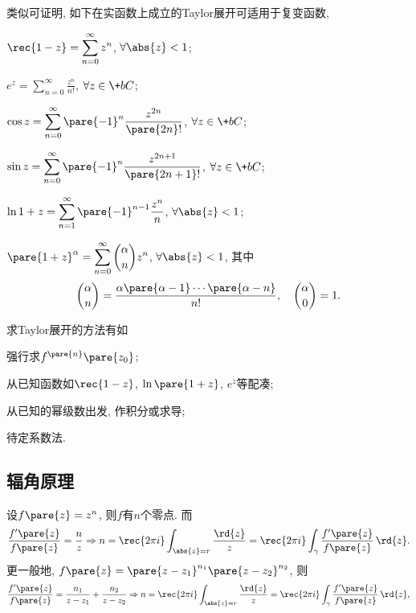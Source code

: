 \documentclass{ctexart}
\begin{document}
类似可证明, 如下在实函数上成立的Taylor展开可适用于复变函数,
\begin{cenum}
    \item $\displaystyle \rec{1-z} = \sum_{n=0}^\infty z^n$, $\forall \abs{z}<1$;
    \item $\displaystyle e^z = \sum_{n=0}^\infty \frac{z^n}{n!}$, $\forall z\in\+bC$;
    \item $\displaystyle \cos z = \sum_{n=0}^\infty \pare{-1}^n\frac{z^{2n}}{\pare{2n}!}$, $\forall z\in\+bC$;
    \item $\displaystyle \sin z = \sum_{n=0}^\infty \pare{-1}^{n}\frac{z^{2n+1}}{\pare{2n+1}!}$, $\forall z\in\+bC$;
    \item $\displaystyle \ln {1+z} = \sum_{n=1}^\infty \pare{-1}^{n-1} \frac{z^n}{n}$, $\forall \abs{z}<1$;
    \item $\displaystyle \pare{1+z}^\alpha = \sum_{n=0}^\infty \binom{\alpha}{n} z^n$, $\forall \abs{z}<1$, 其中
    \[ \binom{\alpha}{n} = \frac{\alpha \pare{\alpha - 1}\cdots \pare{\alpha - n}}{n!},\quad \binom{\alpha}{0} = 1. \]
\end{cenum}
求Taylor展开的方法有如
\begin{cenum}
    \item 强行求$f^{\pare{n}}\pare{z_0}$;
    \item 从已知函数如$\displaystyle \rec{1-z}$, $\ln\pare{1+z}$, $e^z$等配凑;
    \item 从已知的幂级数出发, 作积分或求导;
    \item 待定系数法.
\end{cenum}


\subsection{辐角原理} %
\label{sub:辐角原理}

设$f\pare{z} = z^n$, 则$f$有$n$个零点. 而
\[ \frac{f'\pare{z}}{f\pare{z}} = \frac{n}{z} \Rightarrow n = \rec{2\pi i} \int_{\abs{z} = r} \frac{\rd{z}}{z} = \rec{2\pi i} \int_\gamma \frac{f'\pare{z}}{f\pare{z}}\,\rd{z}. \]
更一般地, $f\pare{z} = \pare{z-z_1}^{n_1}\pare{z-z_2}^{n_2}$, 则
\[ \frac{f'\pare{z}}{f\pare{z}} = \frac{n_1}{z-z_1} + \frac{n_2}{z-z_2} \Rightarrow n = \rec{2\pi i} \int_{\abs{z} =r} \frac{\rd{z}}{z} = \rec{2\pi i }\int_\gamma  \frac{f'\pare{z}}{f\pare{z}}\,\rd{z}, \]
\end{document}
